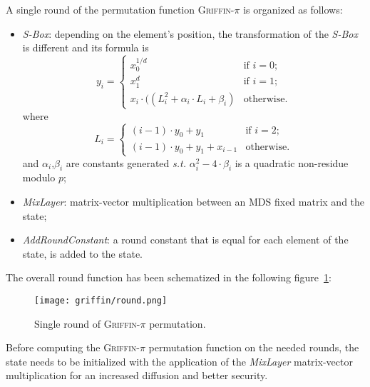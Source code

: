 \documentclass[12pt, a4paper]{report}
\begin{document}
A single round of the permutation function \textsc{Griffin-$\pi$} is organized as follows:
\begin{itemize}
  \item \textit{S-Box}: depending on the element's position, the transformation of the \textit{S-Box} is different and its formula is
  \begin{equation}
    y_i = \left\{
      \begin{array}{ll}
        x_0^{1/d} & \text{if } i = 0; \\
        x_1^{d} & \text{if } i = 1; \\
        x_i \cdot ((L_i^2 + \alpha_i \cdot L_i + \beta_i) & \text{otherwise}.
      \end{array}
    \right.
    \label{eq:griffinsbox}
  \end{equation}
  where
  \begin{equation}
    L_i = \left\{
      \begin{array}{ll}
        (i-1) \cdot y_0 + y_1 & \text{if } i = 2; \\
        (i-1) \cdot y_0 + y_1 + x_{i-1} & \text{otherwise}.
      \end{array}
    \right.
    \label{eq:griffinli}
  \end{equation}
  and $\alpha_i$,$\beta_i$ are constants generated \textsl{s.t.} $\alpha_i^2 - 4 \cdot \beta_i$ is a quadratic non-residue modulo $p$;
  \item \textit{MixLayer}: matrix-vector multiplication between an MDS fixed matrix and the state;
  \item \textit{AddRoundConstant}: a round constant that is equal for each element of the state, is added to the state.
\end{itemize}

The overall round function has been schematized in the following figure~\ref{fig:griffin}:
\begin{figure}[H]
  \begin{center}
    \texttt{[image: griffin/round.png]}
  \end{center}
  \caption{Single round of \textsc{Griffin-$\pi$} permutation.}\label{fig:griffin}
\end{figure}

Before computing the \textsc{Griffin-$\pi$} permutation function on the needed rounds, the state needs to be initialized with the application of the \textit{MixLayer} matrix-vector multiplication for an increased diffusion and better security.
\end{document}
